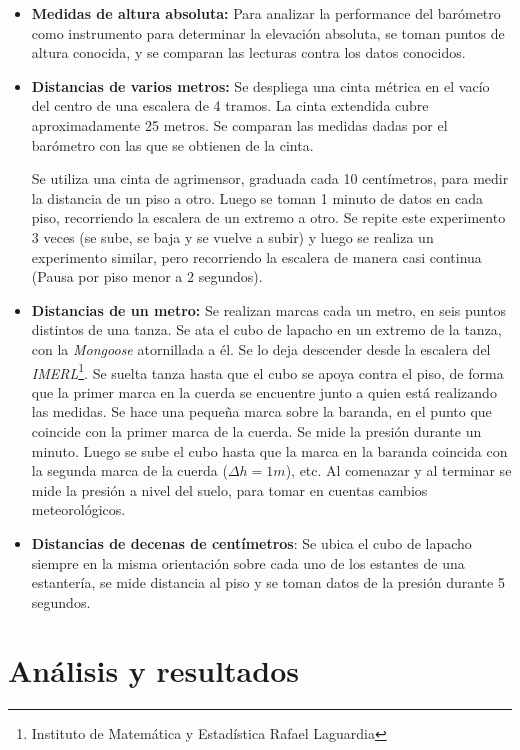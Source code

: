 \documentclass[main]{subfiles}
\begin{document}
\begin{itemize}
\item \textbf{Medidas de altura absoluta:} Para analizar la performance del barómetro como instrumento para determinar la elevación absoluta, se toman puntos de altura conocida, y se comparan las lecturas contra los datos conocidos.

\item \textbf{Distancias de varios metros:} Se despliega una cinta métrica en el vacío del centro de una escalera de 4 tramos. La cinta extendida cubre aproximadamente 25 metros. Se comparan las medidas dadas por el barómetro con las que se obtienen de la cinta.

Se utiliza una cinta de agrimensor, graduada cada 10 centímetros, para medir la distancia de un piso a otro. Luego se toman 1 minuto de datos en cada piso, recorriendo la escalera de un extremo a otro. Se repite este experimento 3 veces (se sube, se baja y se vuelve a subir) y luego se realiza un experimento similar, pero recorriendo la escalera de manera casi continua (Pausa por piso menor a 2 segundos).

\item \textbf{Distancias de un metro:} Se realizan marcas cada un metro, en seis puntos distintos de una tanza. Se ata el cubo de lapacho en un extremo de la tanza, con la \emph{Mongoose} atornillada a él. Se lo deja descender desde la escalera del \emph{IMERL}\footnote{Instituto de Matemática y Estadística Rafael Laguardia}. Se suelta tanza hasta que el cubo se apoya contra el piso, de forma que la primer marca en la cuerda se encuentre junto a quien está realizando las medidas. Se hace una pequeña marca sobre la baranda, en el punto que coincide con la primer marca de la cuerda. Se mide la presión durante un minuto. Luego se sube el cubo hasta que la marca en la baranda coincida con la segunda marca de la cuerda ($\Delta h = 1m$), etc.
Al comenazar y al terminar se mide la presión a nivel del suelo, para tomar en cuentas cambios meteorológicos.

\item \textbf{Distancias de decenas de centímetros}: Se ubica el cubo de lapacho siempre en la misma orientación sobre cada uno de los estantes de una estantería, se mide distancia al piso y se toman datos de la presión durante 5 segundos.

\end{itemize}

\section{Análisis y resultados}
\end{document}
